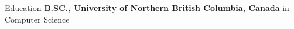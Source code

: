 \begin{rubric}{Education}
\entry*[2022 -- current]%
	\textbf{B.SC., University of Northern British Columbia, Canada} in Computer Science 
\end{rubric}